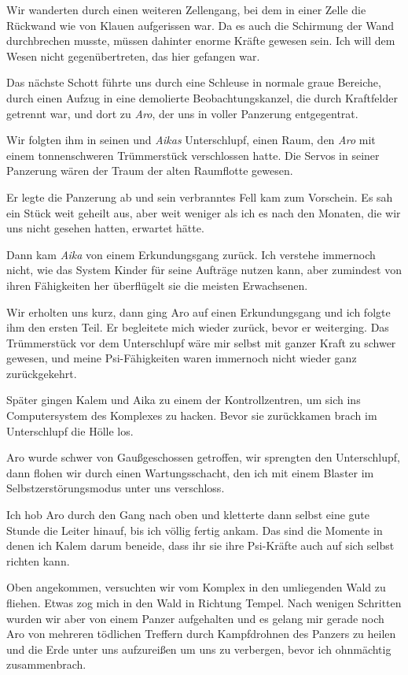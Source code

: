 \documentclass[11pt]{article}
\begin{document}
Wir wanderten durch einen weiteren Zellengang, bei dem in einer Zelle
die Rückwand wie von Klauen aufgerissen war. Da es auch die Schirmung
der Wand durchbrechen musste, müssen dahinter enorme Kräfte gewesen
sein. Ich will dem Wesen nicht gegenübertreten, das hier gefangen war.

Das nächste Schott führte uns durch eine Schleuse in normale graue
Bereiche, durch einen Aufzug in eine demolierte Beobachtungskanzel, die
durch Kraftfelder getrennt war, und dort zu \emph{Aro}, der uns in
voller Panzerung entgegentrat.

Wir folgten ihm in seinen und \emph{Aikas} Unterschlupf, einen Raum, den
\emph{Aro} mit einem tonnenschweren Trümmerstück verschlossen hatte. Die
Servos in seiner Panzerung wären der Traum der alten Raumflotte gewesen.

Er legte die Panzerung ab und sein verbranntes Fell kam zum Vorschein.
Es sah ein Stück weit geheilt aus, aber weit weniger als ich es nach den
Monaten, die wir uns nicht gesehen hatten, erwartet hätte.

Dann kam \emph{Aika} von einem Erkundungsgang zurück. Ich verstehe
immernoch nicht, wie das System Kinder für seine Aufträge nutzen kann,
aber zumindest von ihren Fähigkeiten her überflügelt sie die meisten
Erwachsenen.

Wir erholten uns kurz, dann ging Aro auf einen Erkundungsgang und ich
folgte ihm den ersten Teil. Er begleitete mich wieder zurück, bevor er
weiterging. Das Trümmerstück vor dem Unterschlupf wäre mir selbst mit
ganzer Kraft zu schwer gewesen, und meine Psi-Fähigkeiten waren
immernoch nicht wieder ganz zurückgekehrt.

Später gingen Kalem und Aika zu einem der Kontrollzentren, um sich ins
Computersystem des Komplexes zu hacken. Bevor sie zurückkamen brach im
Unterschlupf die Hölle los.

Aro wurde schwer von Gaußgeschossen getroffen, wir sprengten den
Unterschlupf, dann flohen wir durch einen Wartungsschacht, den ich mit
einem Blaster im Selbstzerstörungsmodus unter uns verschloss.

Ich hob Aro durch den Gang nach oben und kletterte dann selbst eine gute
Stunde die Leiter hinauf, bis ich völlig fertig ankam. Das sind die
Momente in denen ich Kalem darum beneide, dass ihr sie ihre Psi-Kräfte
auch auf sich selbst richten kann.

Oben angekommen, versuchten wir vom Komplex in den umliegenden Wald zu
fliehen. Etwas zog mich in den Wald in Richtung Tempel. Nach wenigen
Schritten wurden wir aber von einem Panzer aufgehalten und es gelang mir
gerade noch Aro von mehreren tödlichen Treffern durch Kampfdrohnen des
Panzers zu heilen und die Erde unter uns aufzureißen um uns zu
verbergen, bevor ich ohnmächtig zusammenbrach.
\end{document}

